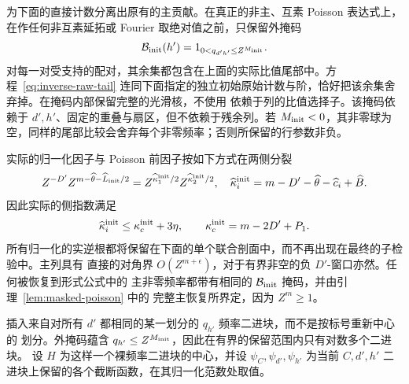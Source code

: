 为下面的直接计数分离出原有的主贡献。在真正的非主、互素 Poisson 表达式上，
在作任何非互素延拓或 Fourier 取绝对值之前，只保留外掩码
\[
 \mathcal B_{\rm init}(h')=1_{0<q_{d'h'}\le Z^{M_{\rm init}}}.
\]
对每一对受支持的配对，其余集都包含在上面的实际比值尾部中。方程~\eqref{eq:inverse-raw-tail}
连同下面指定的独立初始原始计数与阶，恰好把该余集舍弃掉。在掩码内部保留完整的光滑核，不使用
依赖于列的比值选择子。该掩码依赖于 \(d',h'\)、固定的重叠与扇区，但不依赖于残余列。若
\(M_{\rm init}<0\)，其非零球为空，同样的尾部比较会舍弃每个非零频率；否则所保留的行参数非负。

实际的归一化因子与 Poisson 前因子按如下方式在两侧分裂
\[
 Z^{-D'}Z^{m-\widehat\theta-\widehat L_{\rm init}/2}
   =Z^{\widehat\kappa_1^{\rm init}/2}
      Z^{\widehat\kappa_2^{\rm init}/2},
 \quad
 \widehat\kappa_i^{\rm init}=m-D'-\widehat\theta-\widehat c_i+\widehat B.
\]
因此实际的侧指数满足
\begin{equation}\label{eq:initial-poisson-prefactor}
 \widehat\kappa_i^{\rm init}\le\kappa_c^{\rm init}+3\eta,
 \qquad \kappa_c^{\rm init}=m-2D'+P_1.
\end{equation}
所有归一化的实逆根都将保留在下面的单个联合剖面中，而不再出现在最终的子检验中。主列具有
直接的对角界 \(O(Z^{m+\epsilon})\)，对于有界非空的负 \(D'\)-窗口亦然。任何被恢复到形式公式中的
主非零频率都带有相同的 \(\mathcal B_{\rm init}\) 掩码，并由引理~\ref{lem:masked-poisson} 中的
完整主恢复所界定，因为 \(Z^m\ge1\)。

插入来自对所有 \(d'\) 都相同的某一划分的 \(q_{h'}\) 频率二进块，而不是按标号重新中心的
划分。外掩码蕴含 \(q_{h'}\le Z^{M_{\rm init}}\)，因此在有界的保留范围内只有对数多个二进块。
设 \(H\) 为这样一个裸频率二进块的中心，并设 \(\psi_C,\psi_{d'},\psi_{h'}\) 为当前
\(C,d',h'\) 二进块上保留的各个截断函数，在其归一化范数处取值。

